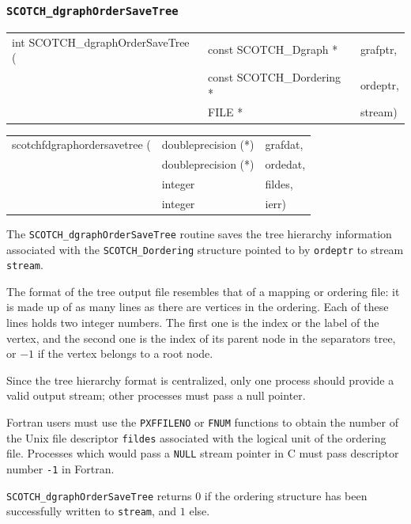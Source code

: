 \subsubsection{{\tt SCOTCH\_dgraphOrderSaveTree}}

\begin{itemize}
\progsyn

{\tt\begin{tabular}{l@{}ll}
int SCOTCH\_dgraphOrderSaveTree ( & const SCOTCH\_Dgraph *    & grafptr, \\
                                  & const SCOTCH\_Dordering * & ordeptr, \\
                                  & FILE *                    & stream)
\end{tabular}}

{\tt\begin{tabular}{l@{}ll}
scotchfdgraphordersavetree ( & doubleprecision (*) & grafdat, \\
                             & doubleprecision (*) & ordedat, \\
                             & integer             & fildes,  \\
                             & integer             & ierr)
\end{tabular}}

\progdes

The {\tt SCOTCH\_dgraphOrderSaveTree} routine saves the tree
hierarchy information associated with the {\tt SCOTCH\_\lbt Dordering}
structure pointed to by {\tt ordeptr} to stream {\tt stream}.

The format of the tree output file resembles that of a mapping or
ordering file: it is made up of as many lines as there are vertices in
the ordering. Each of these lines holds two integer numbers. The first
one is the index or the label of the vertex, and the second one is the
index of its parent node in the separators tree, or $-1$ if the vertex
belongs to a root node.

Since the tree hierarchy format is centralized, only one process
should provide a valid output stream; other processes must pass a
null pointer.

Fortran users must use the {\tt PXFFILENO} or {\tt FNUM} functions to
obtain the number of the Unix file descriptor {\tt fildes} associated
with the logical unit of the ordering file. Processes which would pass
a {\tt NULL} stream pointer in C must pass descriptor number {\tt -1}
in Fortran.

\progret

{\tt SCOTCH\_dgraphOrderSaveTree} returns $0$ if the ordering structure
has been successfully written to {\tt stream}, and $1$ else.
\end{itemize}

